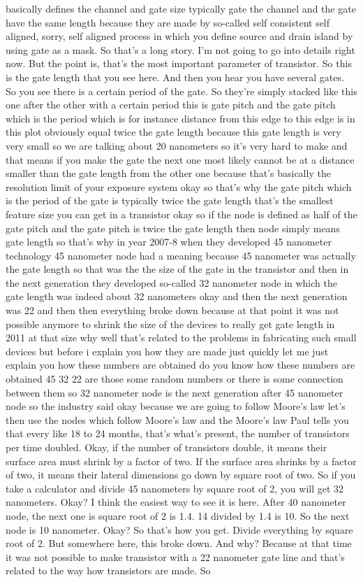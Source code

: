 basically defines the channel and gate size typically gate the channel and the gate have the same length because they are made by so-called self consistent self aligned, sorry, self aligned process in which you define source and drain island by using gate as a mask. So that's a long story. I'm not going to go into details right now. But the point is, that's the most important parameter of transistor. So this is the gate length that you see here. And then you hear you have several gates. So you see there is a certain period of the gate. So they're simply stacked like this one after the other with a certain period this is gate pitch and the gate pitch which is the period which is for instance distance from this edge to this edge is in this plot obviously equal twice the gate length because this gate length is very very small so we are talking about 20 nanometers so it's very hard to make and that means if you make the gate the next one most likely cannot be at a distance smaller than the gate length from the other one because that's basically the resolution limit of your exposure system okay so that's why the gate pitch which is the period of the gate is typically twice the gate length that's the smallest feature size you can get in a transistor okay so if the node is defined as half of the gate pitch and the gate pitch is twice the gate length then node simply means gate length so that's why in year 2007-8 when they developed 45 nanometer technology 45 nanometer node had a meaning because 45 nanometer was actually the gate length so that was the the size of the gate in the transistor and then in the next generation they developed so-called 32 nanometer node in which the gate length was indeed about 32 nanometers okay and then the next generation was 22 and then then everything broke down because at that point it was not possible anymore to shrink the size of the devices to really get gate length in 2011 at that size why well that's related to the problems in fabricating such small devices but before i explain you how they are made just quickly let me just explain you how these numbers are obtained do you know how these numbers are obtained 45 32 22 are those some random numbers or there is some connection between them so 32 nanometer node is the next generation after 45 nanometer node so the industry said okay because we are going to follow Moore's law let's then use the nodes which follow Moore's law and the Moore's law Paul tells you that every like 18 to 24 months, that's what's present, the number of transistors per time doubled. Okay, if the number of transistors double, it means their surface area must shrink by a factor of two. If the surface area shrinks by a factor of two, it means their lateral dimensions go down by square root of two. So if you take a calculator and divide 45 nanometers by square root of 2, you will get 32 nanometers. Okay? I think the easiest way to see it is here. After 40 nanometer node, the next one is square root of 2 is 1.4. 14 divided by 1.4 is 10. So the next node is 10 nanometer. Okay? So that's how you get. Divide everything by square root of 2. But somewhere here, this broke down. And why? Because at that time it was not possible to make transistor with a 22 nanometer gate line and that's related to the way how transistors are made. So 